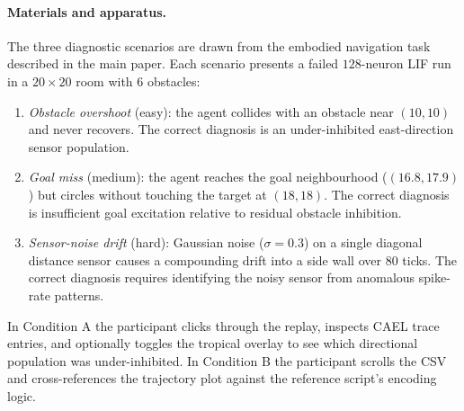 \documentclass[10pt]{article}
\begin{document}
\paragraph{Materials and apparatus.}
The three diagnostic scenarios are drawn from the embodied navigation
task described in the main paper.  Each scenario presents a failed
$128$-neuron LIF run in a $20 \times 20$ room with $6$ obstacles:
\begin{enumerate}[leftmargin=*,topsep=2pt]
  \item \emph{Obstacle overshoot} (easy): the agent collides with an
    obstacle near $(10,10)$ and never recovers.  The correct diagnosis
    is an under-inhibited east-direction sensor population.
  \item \emph{Goal miss} (medium): the agent reaches the goal
    neighbourhood ($(16.8,17.9)$) but circles without touching the
    target at $(18,18)$.  The correct diagnosis is insufficient goal
    excitation relative to residual obstacle inhibition.
  \item \emph{Sensor-noise drift} (hard): Gaussian noise
    ($\sigma=0.3$) on a single diagonal distance sensor causes a
    compounding drift into a side wall over $80$ ticks.  The correct
    diagnosis requires identifying the noisy sensor from anomalous
    spike-rate patterns.
\end{enumerate}
In Condition A the participant clicks through the replay, inspects CAEL
trace entries, and optionally toggles the tropical overlay to see which
directional population was under-inhibited.  In Condition B the participant
scrolls the CSV and cross-references the trajectory plot against the
reference script's encoding logic.
\end{document}
